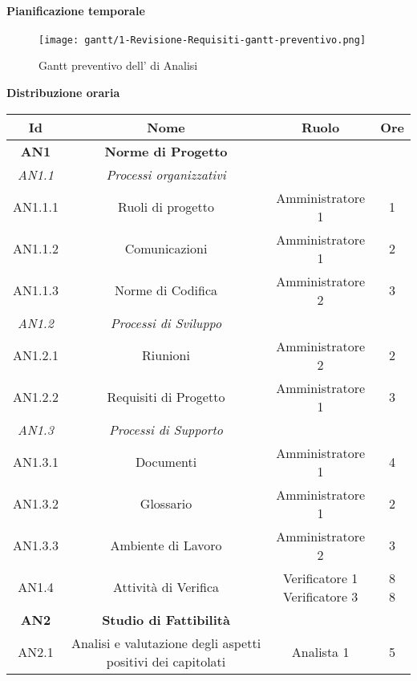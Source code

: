 \documentclass{scalatekids-article}
\begin{document}
\newpage
\paragraph{Pianificazione temporale}
\begin{figure}[H]
  \texttt{[image: gantt/1-Revisione-Requisiti-gantt-preventivo.png]}
  \caption{Gantt preventivo dell' di Analisi}
\end{figure}

\newpage
\textbf{Distribuzione oraria}
\scriptsize
\begin{center}
  \begin{tabular}{| c | c | c | c |}
    \hline
    \textbf{Id} & \textbf{Nome} & \textbf{Ruolo} & \textbf{Ore}\\
    \hline
    \textbf{AN1} & \textbf{Norme di Progetto} & &\\
    \hline
    \textit{AN1.1} & \textit{Processi organizzativi} & &\\
    \hline
    AN1.1.1 & Ruoli di progetto & Amministratore 1 & 1\\
    \hline
    AN1.1.2 & Comunicazioni & Amministratore 1 & 2\\
    \hline
    AN1.1.3 & Norme di Codifica & Amministratore 2 & 3\\
    \hline
    \textit{AN1.2} & \textit{Processi di Sviluppo} & &\\
    \hline
    AN1.2.1 & Riunioni & Amministratore 2 & 2\\
    \hline
    AN1.2.2 & Requisiti di Progetto & Amministratore 1 & 3\\
    \hline
    \textit{AN1.3} & \textit{Processi di Supporto} & &\\
    \hline
    AN1.3.1 & Documenti & Amministratore 1 & 4\\
    \hline
    AN1.3.2 & Glossario & Amministratore 1 & 2\\
    \hline
    AN1.3.3 & Ambiente di Lavoro & Amministratore 2 & 3\\
    \hline
    AN1.4 & Attività di Verifica & \multiLineCell[t]{Verificatore 1\\Verificatore 3} & \multiLineCell[t]{8\\8}\\
    \hline
    \textbf{AN2} & \textbf{Studio di Fattibilità} & &\\
    \hline
    AN2.1 & Analisi e valutazione degli aspetti positivi dei capitolati & Analista 1 & 5\\
    \hline

\end{tabular}
\end{center}
\end{document}
